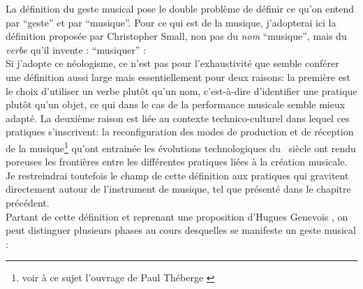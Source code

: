 \noindent La définition du geste musical pose le double problème de définir ce qu'on entend par ``geste'' et par ``musique''. Pour ce qui est de la musique, j'adopterai ici la définition proposée par Christopher Small, non pas du \textit{nom} ``musique'', mais du \textit{verbe} qu'il invente : ``musiquer'' \cite{small_musicking:_1998}:
\\
\indent Si j'adopte ce néologisme, ce n'est pas pour l'exhaustivité que semble conférer une définition aussi large mais essentiellement pour deux raisons: la première est le choix d'utiliser un verbe plutôt qu'un nom, c'est-à-dire d'identifier une pratique plutôt qu'un objet, ce qui dans le cas de la performance musicale semble mieux adapté. La deuxième raison est liée au contexte technico-culturel dans lequel ces pratiques s'inscrivent: la reconfiguration des modes de production et de réception de la musique\footnote{voir à ce sujet l'ouvrage de Paul Théberge \cite{theberge_any_1997}} qu'ont entrainée les évolutions technologiques du ~siècle ont rendu poreuses les frontières entre les différentes pratiques liées à la création musicale. Je restreindrai toutefois le champ de cette définition aux pratiques qui gravitent directement autour de l'instrument de musique, tel que présenté dans le chapitre précédent.\\
\indent Partant de cette définition et reprenant une proposition d'Hugues Genevois \cite{genevois_geste_1999}, on peut distinguer plusieurs phases au cours desquelles se manifeste un geste musical :

